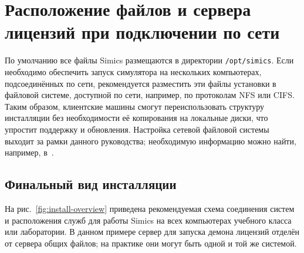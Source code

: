 \section{Расположение файлов и сервера лицензий при подключении по сети}

По умолчанию все файлы Simics размещаются в директории \texttt{/opt/simics}. Если необходимо обеспечить запуск симулятора на нескольких компьютерах, подсоединённых по сети, рекомендуется разместить эти файлы установки в файловой системе, доступной по сети, например, по протоколам NFS или CIFS. Таким образом, клиентские машины смогут переиспользовать структуру инсталляции без необходимости её копирования на локальные диски, что упростит поддержку и обновления. Настройка сетевой файловой системы выходит за рамки данного руководства; необходимую информацию можно найти, например, в~\cite{nfs}.

\subsection{Финальный вид инсталляции}

На рис.~\ref{fig:install-overview} приведена рекомендуемая схема соединения систем и расположения служб для работы Simics на всех компьютерах учебного класса или лаборатории. В данном примере сервер для запуска демона лицензий отделён от сервера общих файлов; на практике они могут быть одной и той же системой.

